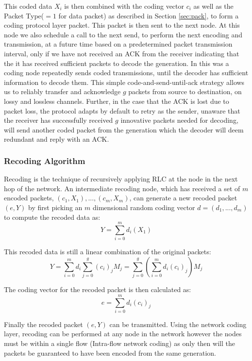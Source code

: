 \documentclass[12pt,a4paper,twoside,openright]{report}
\begin{document}
This coded data $X_i$ is then combined with the coding vector $c_i$ as well as the Packet Type($= 1$ for data packet) as described in Section \ref{sec:pack}, to form a coding protocol layer packet. This packet is then sent to the next node. At this node we also schedule a call to the next send, to perform the next encoding and transmission, at a future time based on a predetermined packet transmission interval, only if we have not received an ACK from the receiver indicating that the it has received sufficient packets to decode the generation. In this was a coding node repeatedly sends coded transmissions, until the decoder has sufficient information to decode them. This simple code-and-send-until-ack strategy allows us to reliably transfer and acknowledge $g$ packets from source to destination, on lossy and lossless channels. Further, in the case that the ACK is lost due to packet loss, the protocol adapts by default to retry as the sender, unaware that the receiver has successfully received $g$ innovative packets needed for decoding, will send another coded packet from the generation which the decoder will deem redundant and reply with an ACK.

\subsubsection{Recoding Algorithm}
Recoding is the technique of recursively applying RLC at the node in the next hop of the network. An intermediate recoding node, which has received a set of $m$ encoded packets, $(c_1, X_1), ..., (c_m, X_m)$, can generate a new recoded packet $(e, Y)$ by first picking an $m$ dimensional random coding vector $d = (d_1, ..., d_m)$ to compute the recoded data as:
\begin{equation}
	Y = \sum_{i = 0}^m d_i (X_1)
\end{equation}

This recoded data is still a linear combination of the original packets:
\begin{equation}
	Y = \sum_{i = 0}^m d_i \sum_{j = 0}^g (c_i)_j M_j
	= \sum_{j = 0}^g \left(\sum_{i = 0}^m d_i (c_i)_j \right) M_j
\end{equation}

The coding vector for the recoded packet is then calculated as:
\begin{equation}
	e = \sum_{i = 0}^m d_i (c_i)_j
\end{equation}

Finally the recoded packet $(e, Y)$ can be transmitted. Using the network coding layer, recoding can be performed at any node in the network however the nodes must be within a single flow (Intra-flow network coding) as only then will the packets be guaranteed to have been encoded from the same generation.
\end{document}

